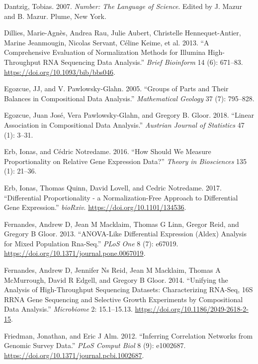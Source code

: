\documentclass[onecolumn]{article}
\begin{document}
\leavevmode\hypertarget{ref-number}{}%
Dantzig, Tobias. 2007. \emph{Number: The Language of Science}. Edited by J. Mazur and B. Mazur. Plume, New York.

\leavevmode\hypertarget{ref-Dillies:2013}{}%
Dillies, Marie-Agnès, Andrea Rau, Julie Aubert, Christelle Hennequet-Antier, Marine Jeanmougin, Nicolas Servant, Céline Keime, et al. 2013. ``A Comprehensive Evaluation of Normalization Methods for Illumina High-Throughput RNA Sequencing Data Analysis.'' \emph{Brief Bioinform} 14 (6): 671--83. \url{https://doi.org/10.1093/bib/bbs046}.

\leavevmode\hypertarget{ref-egozcue2005}{}%
Egozcue, JJ, and V. Pawlowsky-Glahn. 2005. ``Groups of Parts and Their Balances in Compositional Data Analysis.'' \emph{Mathematical Geology} 37 (7): 795--828.

\leavevmode\hypertarget{ref-egozcue:AJS}{}%
Egozcue, Juan José, Vera Pawlowsky-Glahn, and Gregory B. Gloor. 2018. ``Linear Association in Compositional Data Analysis.'' \emph{Austrian Journal of Statistics} 47 (1): 3--31.

\leavevmode\hypertarget{ref-erb:2016}{}%
Erb, Ionas, and Cédric Notredame. 2016. ``How Should We Measure Proportionality on Relative Gene Expression Data?'' \emph{Theory in Biosciences} 135 (1): 21--36.

\leavevmode\hypertarget{ref-Erb134536}{}%
Erb, Ionas, Thomas Quinn, David Lovell, and Cedric Notredame. 2017. ``Differential Proportionality - a Normalization-Free Approach to Differential Gene Expression.'' \emph{bioRxiv}. \url{https://doi.org/10.1101/134536}.

\leavevmode\hypertarget{ref-fernandes:2013}{}%
Fernandes, Andrew D, Jean M Macklaim, Thomas G Linn, Gregor Reid, and Gregory B Gloor. 2013. ``ANOVA-Like Differential Expression (Aldex) Analysis for Mixed Population Rna-Seq.'' \emph{PLoS One} 8 (7): e67019. \url{https://doi.org/10.1371/journal.pone.0067019}.

\leavevmode\hypertarget{ref-fernandes:2014}{}%
Fernandes, Andrew D, Jennifer Ns Reid, Jean M Macklaim, Thomas A McMurrough, David R Edgell, and Gregory B Gloor. 2014. ``Unifying the Analysis of High-Throughput Sequencing Datasets: Characterizing RNA-Seq, 16S RRNA Gene Sequencing and Selective Growth Experiments by Compositional Data Analysis.'' \emph{Microbiome} 2: 15.1--15.13. \url{https://doi.org/10.1186/2049-2618-2-15}.

\leavevmode\hypertarget{ref-Friedman:2012}{}%
Friedman, Jonathan, and Eric J Alm. 2012. ``Inferring Correlation Networks from Genomic Survey Data.'' \emph{PLoS Comput Biol} 8 (9): e1002687. \url{https://doi.org/10.1371/journal.pcbi.1002687}.
\end{document}

